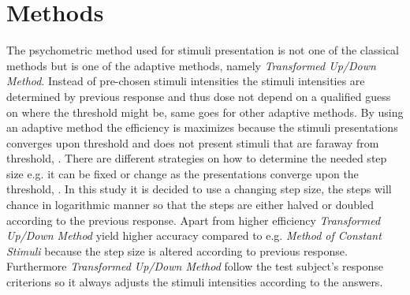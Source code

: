 \section*{Methods}
\label{Methods}
%
The psychometric method used for stimuli presentation is not one of the classical methods but is one of the adaptive methods, namely \textit{Transformed Up/Down Method}. Instead of pre-chosen stimuli intensities the stimuli intensities are determined by previous response and thus dose not depend on a qualified guess on where the threshold might be, same goes for other adaptive methods. By using an adaptive method the efficiency is maximizes because the stimuli presentations converges upon threshold and does not present stimuli that are faraway from threshold, \parencite[p. 287]{PDF:Hearing}. There are different strategies on how to determine the needed step size e.g. it can be fixed or change as the presentations converge upon the threshold, \parencite[p. 22]{PDF:Psychoacoustic}. In this study it is decided to use a changing step size, the steps will chance in logarithmic manner so that the steps are either halved or doubled according to the previous response. Apart from higher efficiency \textit{Transformed Up/Down Method} yield higher accuracy compared to e.g. \textit{Method of Constant Stimuli} because the step size is altered according to previous response. Furthermore \textit{Transformed Up/Down Method} follow the test subject's response criterions so it always adjusts the stimuli intensities according to the answers.  

